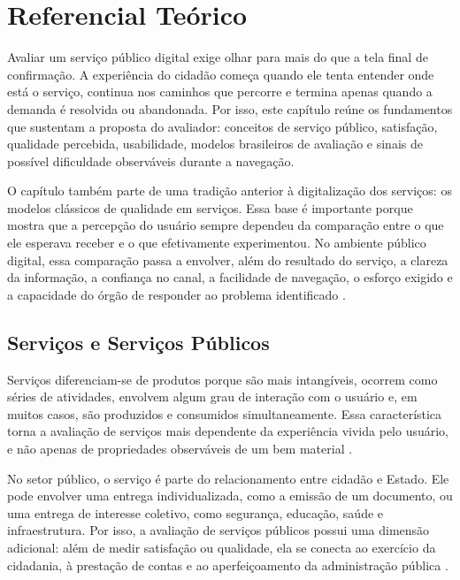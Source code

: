 \chapter{Referencial Teórico}
\label{cap:2}

Avaliar um serviço público digital exige olhar para mais do que a tela final de confirmação. A experiência do cidadão começa quando ele tenta entender onde está o serviço, continua nos caminhos que percorre e termina apenas quando a demanda é resolvida ou abandonada. Por isso, este capítulo reúne os fundamentos que sustentam a proposta do avaliador: conceitos de serviço público, satisfação, qualidade percebida, usabilidade, modelos brasileiros de avaliação e sinais de possível dificuldade observáveis durante a navegação.

O capítulo também parte de uma tradição anterior à digitalização dos serviços: os modelos clássicos de qualidade em serviços. Essa base é importante porque mostra que a percepção do usuário sempre dependeu da comparação entre o que ele esperava receber e o que efetivamente experimentou. No ambiente público digital, essa comparação passa a envolver, além do resultado do serviço, a clareza da informação, a confiança no canal, a facilidade de navegação, o esforço exigido e a capacidade do órgão de responder ao problema identificado \cite{gronroos1984,parasuraman1988,delone2003}.

\section{Serviços e Serviços Públicos}
\label{sec:2.1}

Serviços diferenciam-se de produtos porque são mais intangíveis, ocorrem como séries de atividades, envolvem algum grau de interação com o usuário e, em muitos casos, são produzidos e consumidos simultaneamente. Essa característica torna a avaliação de serviços mais dependente da experiência vivida pelo usuário, e não apenas de propriedades observáveis de um bem material \cite{gronroos1984,lima2020m1}.

No setor público, o serviço é parte do relacionamento entre cidadão e Estado. Ele pode envolver uma entrega individualizada, como a emissão de um documento, ou uma entrega de interesse coletivo, como segurança, educação, saúde e infraestrutura. Por isso, a avaliação de serviços públicos possui uma dimensão adicional: além de medir satisfação ou qualidade, ela se conecta ao exercício da cidadania, à prestação de contas e ao aperfeiçoamento da administração pública \cite{brasil2017lei,brasil2021,lima2020m1}.

